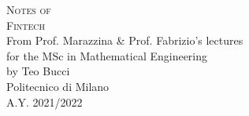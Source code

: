 \documentclass[10pt,a4paper]{book}
\begin{document}
\frontmatter

\pagestyle{empty}


\hypertarget{mytitlepage}{} %

\vspace*{\fill}

\begin{center}
	{\large \textsc{Notes of}}\\
	\vspace*{0.4cm}
	{\Huge \textsc{Fintech}}\\
	\vspace*{1cm}
	{\large {From Prof. Marazzina \& Prof. Fabrizio's lectures}}\\
	\vspace*{0.1cm}
	{\large for the MSc in Mathematical Engineering}\\
	\vspace*{0.4cm}
	{\large {by Teo Bucci}}\\
	\vspace*{1cm}
	Politecnico di Milano\\
	A.Y. 2021/2022
\end{center}
\vspace*{\fill}
\clearpage


\hypertarget{mycopyright}{} %

\clearpage


\hypertarget{mypreface}{} %

\clearpage


\cleardoublepage
\pagestyle{toc}
\hypertarget{mytoc}{} %
\bookmark[dest=mytoc,level=chapter]{\contentsname} %
\tableofcontents
\cleardoublepage


\pagestyle{fancy}
\mainmatter

 \cleardoublepage
 \cleardoublepage



\end{document}

